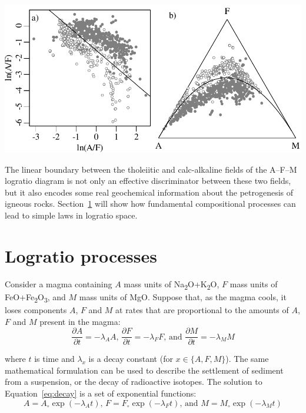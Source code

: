 \noindent\begin{minipage}[t][][b]{.7\textwidth}
\includegraphics[width=\textwidth]{../figures/LDAAFM.pdf}\medskip
\end{minipage}
\begin{minipage}[t][][t]{.3\textwidth}
  \label{fig:LDAAFM}
\end{minipage}

The linear boundary between the tholeiitic and calc-alkaline fields of
the A--F--M logratio diagram is not only an effective discriminator
between these two fields, but it also encodes some real geochemical
information about the petrogenesis of igneous
rocks. Section~\ref{sec:logratio-processes} will show how fundamental
compositional processes can lead to simple laws in logratio space.

\section{Logratio processes}
\label{sec:logratio-processes}

Consider a magma containing $A$ mass units of
Na\textsubscript{2}O+K\textsubscript{2}O, $F$ mass units of
FeO+Fe\textsubscript{2}O\textsubscript{3}, and $M$ mass units of
MgO. Suppose that, as the magma cools, it loses components $A$, $F$
and $M$ at rates that are proportional to the amounts of $A$, $F$ and
$M$ present in the magma:
\begin{equation}
  \frac{\partial A}{\partial t} = -\lambda_A A \mbox{,~}
  \frac{\partial F}{\partial t} = -\lambda_F F \mbox{,~and~}
  \frac{\partial M}{\partial t} = -\lambda_M M
  \label{eq:decay}
\end{equation}

\noindent where $t$ is time and $\lambda_x$ is a decay constant (for
$x \in \{A, F, M\}$). The same mathematical formulation can be used to
describe the settlement of sediment from a suspension, or the decay of
radioactive isotopes.  The solution to Equation~\ref{eq:decay} is a
set of exponential functions:
\begin{equation}
  A = A_\circ \exp(-\lambda_A t) \mbox{,~}
  F = F_\circ \exp(-\lambda_F t) \mbox{,~and~}
  M = M_\circ \exp(-\lambda_M t)
  \label{eq:expdecay}
\end{equation}

